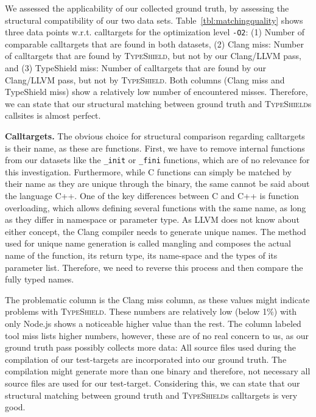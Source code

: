 We assessed the applicability of our collected ground truth, by assessing the structural compatibility of our two data sets. 
Table~\ref{tbl:matchingquality} shows three data points w.r.t. calltargets for the optimization level \texttt{-O2}:
(1) Number of comparable calltargets that are found in both datasets, 
(2) Clang miss: Number of calltargets that are found by \textsc{TypeShield}, but not by our Clang/LLVM pass, and 
(3) TypeShield miss: Number of calltargets that are found by our Clang/LLVM pass, but not by \textsc{TypeShield}.
Both columns (Clang miss and TypeShield miss) show a relatively low number of encountered misses. Therefore, we can 
state that our structural matching between ground truth and \textsc{TypeShield}s callsites is almost perfect.

\textbf{Calltargets.} The obvious choice for structural comparison regarding calltargets is their name, as these are functions. First, we have to remove internal 
functions from our datasets like the \texttt{\_init} or \texttt{\_fini} functions, which are of no relevance for this investigation. Furthermore, while C functions can
simply be matched by their name as they are unique through the binary, the same cannot be said about the language C++. One of the key differences between C and C++ is 
function overloading, which allows defining several functions with the same name, as long as they differ in namespace or parameter type. 
As LLVM does not know about either concept, the Clang compiler needs to generate unique names. The method used for unique name generation is called mangling and composes
the actual name of the function, its return type, its name-space and the types of its parameter list. Therefore, we need to reverse this process and then compare the fully
typed names. 

The problematic column is the Clang miss column, as these values might indicate problems with \textsc{TypeShield}. These numbers are relatively low (below 1\%) with only Node.js
shows a noticeable higher value than the rest. The column labeled tool miss lists higher numbers, however, these are of no real concern to us, as our ground truth 
pass possibly collects more data: All source files used during the compilation of our test-targets are incorporated into our ground truth. The compilation might generate more than
one binary and therefore, not necessary all source files are used for our test-target.
Considering this, we can state that our structural matching between ground truth and \textsc{TypeShield}s calltargets is very good.

